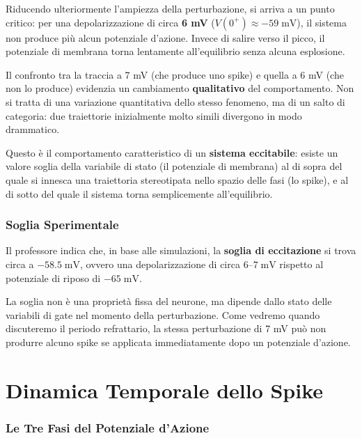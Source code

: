 Riducendo ulteriormente l'ampiezza della perturbazione, si arriva a un punto critico: per una depolarizzazione di circa \textbf{6 mV} ($V(0^+) \approx -59 \; \text{mV}$), il sistema non produce più alcun potenziale d'azione. Invece di salire verso il picco, il potenziale di membrana torna lentamente all'equilibrio senza alcuna esplosione.

Il confronto tra la traccia a 7 mV (che produce uno spike) e quella a 6 mV (che non lo produce) evidenzia un cambiamento \textbf{qualitativo} del comportamento. Non si tratta di una variazione quantitativa dello stesso fenomeno, ma di un salto di categoria: due traiettorie inizialmente molto simili divergono in modo drammatico.

Questo è il comportamento caratteristico di un \textbf{sistema eccitabile}: esiste un valore soglia della variabile di stato (il potenziale di membrana) al di sopra del quale si innesca una traiettoria stereotipata nello spazio delle fasi (lo spike), e al di sotto del quale il sistema torna semplicemente all'equilibrio.

\subsubsection{Soglia Sperimentale}

Il professore indica che, in base alle simulazioni, la \textbf{soglia di eccitazione} si trova circa a $-58.5 \; \text{mV}$, ovvero una depolarizzazione di circa $6$–$7 \; \text{mV}$ rispetto al potenziale di riposo di $-65 \; \text{mV}$.

\begin{tcolorbox}[colback=gray!5, colframe=gray!40, arc=2mm, boxrule=0.5pt]
 La soglia non è una proprietà fissa del neurone, ma dipende dallo stato delle variabili di gate nel momento della perturbazione. Come vedremo quando discuteremo il periodo refrattario, la stessa perturbazione di 7 mV può non produrre alcuno spike se applicata immediatamente dopo un potenziale d'azione.
\end{tcolorbox}

\section{Dinamica Temporale dello Spike}

\subsubsection{Le Tre Fasi del Potenziale d'Azione}

